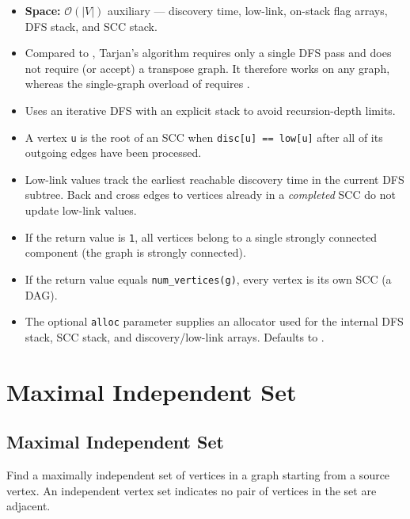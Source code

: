 \begin{itemdescr}
\begin{itemize}
                        and edge visited at most once.
                  \item \textbf{Space:} $\mathcal{O}(|V|)$ auxiliary --- discovery time, low-link,
                        on-stack flag arrays, DFS stack, and SCC stack.
            \end{itemize}
      \pnum\remarks
            \begin{itemize}
                  \item Compared to , Tarjan's algorithm requires only a single
                        DFS pass and does not require (or accept) a transpose graph. It therefore
                        works on any  graph, whereas the single-graph
                        overload of  requires .
                  \item Uses an iterative DFS with an explicit stack to avoid recursion-depth limits.
                  \item A vertex \lstinline{u} is the root of an SCC when
                        \lstinline{disc[u] == low[u]} after all of its outgoing edges have been
                        processed.
                  \item Low-link values track the earliest reachable discovery time in the
                        current DFS subtree.  Back and cross edges to vertices already in a
                        \emph{completed} SCC do not update low-link values.
                  \item If the return value is \lstinline{1}, all vertices belong to a single
                        strongly connected component (the graph is strongly connected).
                  \item If the return value equals \lstinline{num_vertices(g)}, every vertex
                        is its own SCC (a DAG).
                  \item The optional \lstinline{alloc} parameter supplies an allocator used for
                        the internal DFS stack, SCC stack, and discovery/low-link arrays.  Defaults
                        to .
            \end{itemize}
\end{itemdescr}

\section{Maximal Independent Set}
\subsection{Maximal Independent Set}
Find a maximally independent set of vertices in a graph starting from a source vertex. An independent vertex set indicates no pair of vertices in the set are adjacent.

